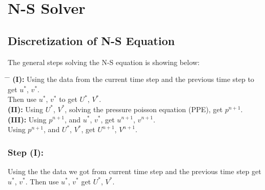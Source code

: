 \documentclass[12pt]{article}
\begin{document}



\newpage
\section{N-S Solver}
\subsection{Discretization of N-S Equation}
The general steps solving the N-S equation is showing below:\\



\begin{tabbing}
\hspace*{2cm} \= \hspace*{2.5cm} \= \kill
\textbf{(I):} \> Using the data from the current time step and the previous time step to get $u^{*}$, $v^{*}$. \\
\> Then use $u^{*}$, $v^{*}$ to get $U^{*}$, $V^{*}$.\\


\textbf{(II):} \> Using $U^{*}$, $V^{*}$, solving the pressure poisson equation (PPE),  get $p^{n+1}$.\\


\textbf{(III):} \> Using $p^{n+1}$, and $u^{*}$, $v^{*}$, get $u^{n+1}$, $v^{n+1}$. \\
\> Using $p^{n+1}$, and $U^{*}$, $V^{*}$, get $U^{n+1}$, $V^{n+1}$.
\end{tabbing}









\subsubsection{Step (I):}
Using the the data we got from current time step and the previous time step get $u^{*}$, $v^{*}$.
    Then use $u^{*}$, $v^{*}$ get $U^{*}$, $V^{*}$.\\
\end{document}
